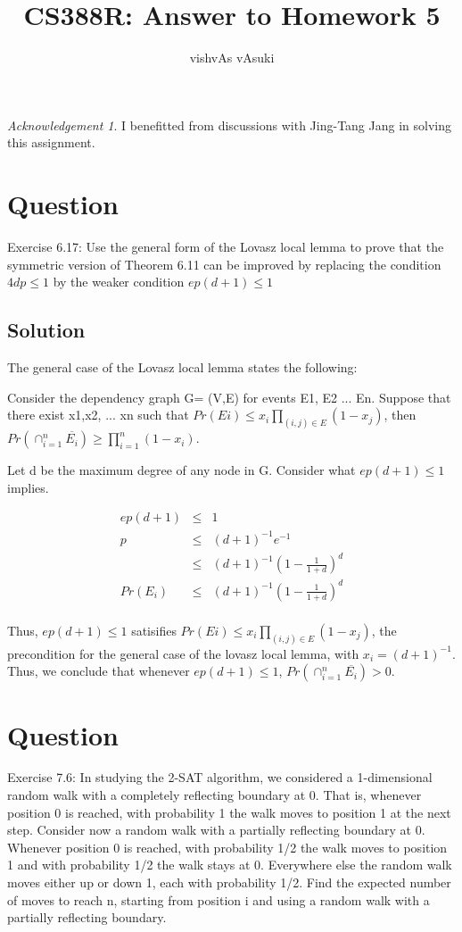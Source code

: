 \documentclass[10pt]{amsart}
\title{CS388R: Answer to Homework 5}
\author{vishvAs vAsuki}
\theoremstyle{remark}
\newtheorem*{ack}{Acknowledgement}
\begin{document}
\maketitle

\begin{ack}
I benefitted from discussions with Jing-Tang Jang in solving this assignment.
\end{ack}

\section{Question}
Exercise 6.17: Use the general form of the Lovasz local lemma to prove that the symmetric version of Theorem 6.11 can be improved by replacing the condition $4dp \leq 1$ by the weaker condition $ep(d+1)\leq 1$

\subsection{Solution}

The general case of the Lovasz local lemma states the following:

Consider the dependency graph G= (V,E) for events E1, E2 ... En. Suppose that there exist x1,x2, ... xn such that $Pr(Ei) \leq x_{i} \prod_{(i,j)\in E} (1-x_{j})$, then $Pr(\cap_{i=1}^{n}\overline{E_{i}}) \geq \prod_{i=1}^{n}(1-x_{i})$.

Let d be the maximum degree of any node in G. Consider what $ep(d+1) \leq 1$ implies.

\begin{eqnarray}
ep(d+1) &\leq& 1\\
p &\leq& (d+1)^{-1}e^{-1}\\
 &\leq& (d+1)^{-1}(1-\frac{1}{1+d})^{d}\\
Pr(E_{i}) &\leq& (d+1)^{-1}(1-\frac{1}{1+d})^{d}\\
\end{eqnarray}

Thus, $ep(d+1) \leq 1$ satisifies $Pr(Ei) \leq x_{i} \prod_{(i,j)\in E} (1-x_{j})$, the precondition for the general case of the lovasz local lemma, with $x_{i} = (d+1)^{-1}$. Thus, we conclude that whenever $ep(d+1) \leq 1$, $Pr(\cap_{i=1}^{n}\overline{E_{i}}) > 0$.

\section{Question}
Exercise 7.6: In studying the 2-SAT algorithm, we considered a 1-dimensional random walk with a completely reflecting boundary at 0. That is, whenever position 0 is reached, with probability 1 the walk moves to position 1 at the next step. Consider now a random walk with a partially reflecting boundary at 0. Whenever position 0 is reached, with probability 1/2 the walk moves to position 1 and with probability 1/2 the walk stays at 0. Everywhere else the random walk moves either up or down 1, each with probability 1/2. Find the expected number of moves to reach n, starting from position i and using a random walk with a partially reflecting boundary.
\end{document}

